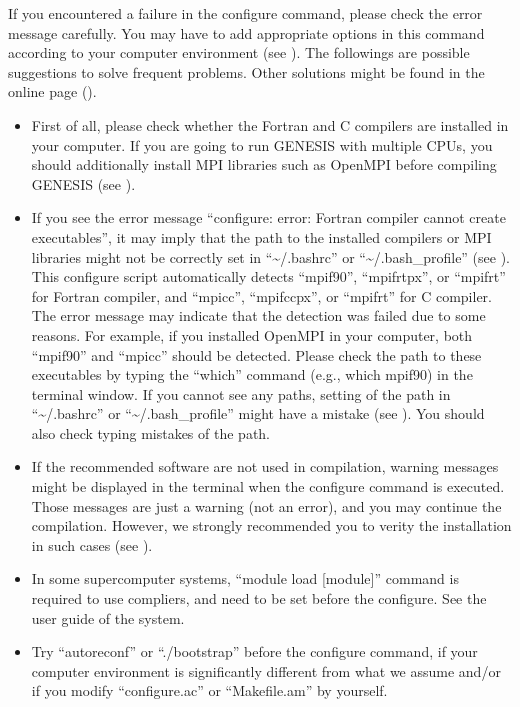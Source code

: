 \documentclass[a4paper,11pt,oneside,english]{sphinxmanual}
\begin{document}
If you encountered a failure in the configure command, please check the error message carefully.
You may have to add appropriate options in this command according to your computer environment (see {\hyperref[\detokenize{01_Getting_Started:advanced-installation}]{}}).
The followings are possible suggestions to solve frequent problems.
Other solutions might be found in the online page ().
\begin{itemize}
\item {} 
First of all, please check whether the Fortran and C compilers are installed in your computer.
If you are going to run GENESIS with multiple CPUs, you should additionally install
MPI libraries such as OpenMPI before compiling GENESIS (see {\hyperref[\detokenize{98_Appendix:appendix}]{}}).

\item {} 
If you see the error message “configure: error: Fortran compiler cannot create executables”,
it may imply that the path to the installed compilers or MPI libraries might not be correctly
set in “\textasciitilde{}/.bashrc” or “\textasciitilde{}/.bash\_profile” (see {\hyperref[\detokenize{98_Appendix:appendix}]{}}).
This configure script automatically detects “mpif90”, “mpifrtpx”, or “mpifrt” for Fortran compiler,
and “mpicc”, “mpifccpx”, or “mpifrt” for C compiler.
The error message may indicate that the detection was failed due to some reasons.
For example, if you installed OpenMPI in your computer, both “mpif90” and “mpicc” should be detected.
Please check the path to these executables by typing the “which” command (e.g., which mpif90) in the terminal window.
If you cannot see any paths, setting of the path in “\textasciitilde{}/.bashrc” or “\textasciitilde{}/.bash\_profile” might have a mistake (see {\hyperref[\detokenize{98_Appendix:appendix}]{}}).
You should also check typing mistakes of the path.

\item {} 
If the recommended software are not used in compilation, warning messages might be
displayed in the terminal when the configure command is executed.
Those messages are just a warning (not an error), and you may continue the compilation.
However, we strongly recommended you to verity the installation in such cases
(see {\hyperref[\detokenize{01_Getting_Started:verify-installation}]{}}).

\item {} 
In some supercomputer systems, “module load {[}module{]}” command is required to use
compliers, and need to be set before the configure. See the user guide of the system.

\item {} 
Try “autoreconf” or “./bootstrap” before the configure command,
if your computer environment is significantly different from what we assume
and/or if you modify “configure.ac” or “Makefile.am” by yourself.

\end{itemize}
\end{document}
